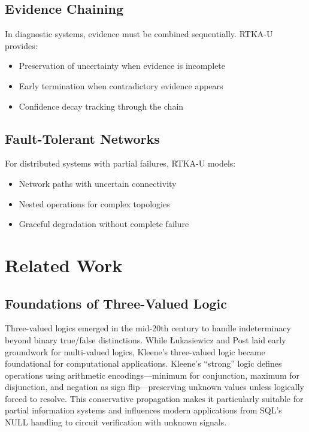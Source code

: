 \documentclass[11pt,a4paper]{article}
\begin{document}
\subsection{Evidence Chaining}

In diagnostic systems, evidence must be combined sequentially. RTKA-U provides:

\begin{itemize}
\item Preservation of uncertainty when evidence is incomplete
\item Early termination when contradictory evidence appears
\item Confidence decay tracking through the chain
\end{itemize}

\subsection{Fault-Tolerant Networks}

For distributed systems with partial failures, RTKA-U models:

\begin{itemize}
\item Network paths with uncertain connectivity
\item Nested operations for complex topologies
\item Graceful degradation without complete failure
\end{itemize}

\section{Related Work}

\subsection{Foundations of Three-Valued Logic}

Three-valued logics emerged in the mid-20th century to handle indeterminacy beyond binary true/false distinctions. While Łukasiewicz \cite{lukasiewicz1920} and Post \cite{post1921} laid early groundwork for multi-valued logics, Kleene's three-valued logic \cite{kleene1952} became foundational for computational applications. Kleene's ``strong'' logic defines operations using arithmetic encodings—minimum for conjunction, maximum for disjunction, and negation as sign flip—preserving unknown values unless logically forced to resolve. This conservative propagation makes it particularly suitable for partial information systems and influences modern applications from SQL's NULL handling to circuit verification with unknown signals.
\end{document}
